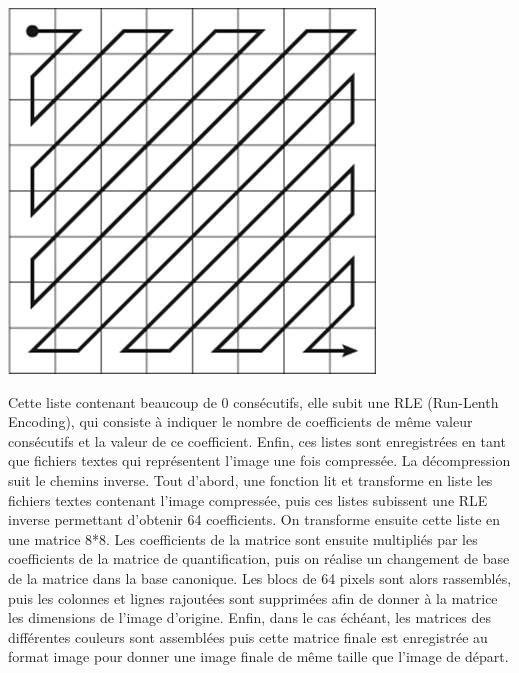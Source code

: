 \documentclass[12pt]{article}
\begin{document}
 \begin{center}
 \includegraphics[scale=0.7]{image4}
 \end{center}
	
Cette liste contenant beaucoup de 0 consécutifs, elle subit une RLE (Run-Lenth Encoding), qui consiste à indiquer le nombre de coefficients de même valeur consécutifs et la valeur de ce coefficient. Enfin, ces listes sont enregistrées en tant que fichiers textes qui représentent l’image une fois compressée.
\newline
La décompression suit le chemins inverse. Tout d’abord, une fonction lit et transforme en liste les fichiers textes contenant l’image compressée, puis ces listes subissent une RLE inverse permettant d’obtenir 64 coefficients. On transforme ensuite cette liste en une matrice 8*8. Les coefficients de la matrice sont ensuite multipliés par les coefficients de la matrice de quantification, puis on réalise un changement de base de la matrice dans la base canonique. Les blocs de 64 pixels sont alors rassemblés, puis les colonnes et lignes rajoutées sont supprimées afin de donner à la matrice les dimensions de l’image d’origine. Enfin, dans le cas échéant, les matrices des différentes couleurs sont assemblées puis cette matrice finale est enregistrée au format image pour donner une image finale de même taille que l’image de départ.
\newpage
\end{document}
